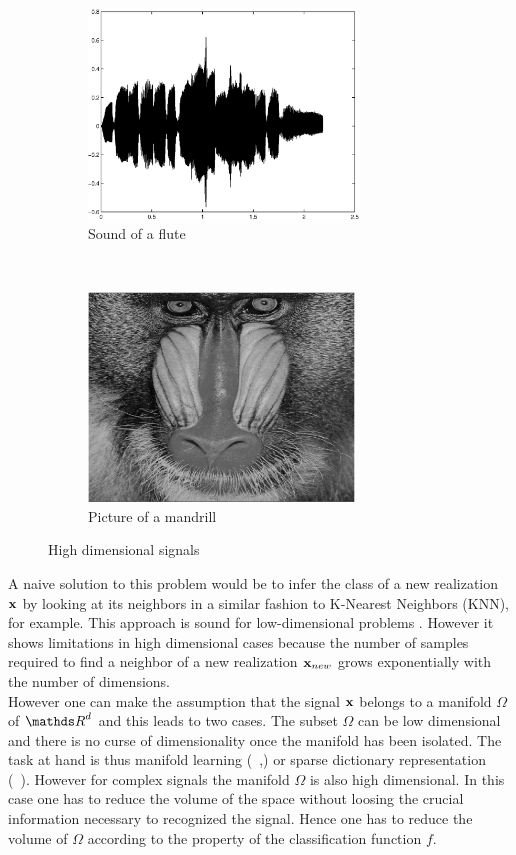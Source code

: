 \documentclass[a4paper,11pt]{report}
\begin{document}
		\begin{figure}[t!]
			\centering
			\begin{subfigure}[t]{0.5\textwidth}
				\centering
				\includegraphics[height=2.2in]{waveform_flute.eps}
				\caption{Sound of a flute}
			\end{subfigure}%
			~ 
			\begin{subfigure}[t]{0.5\textwidth}
        \centering
        \includegraphics[height=2.2in]{im_mandrill.eps}
        \caption{Picture of a mandrill}
			\end{subfigure}
			\caption{High dimensional signals}
			\label{fig:highDim signals}
		\end{figure}
		
		A naive solution to this problem would be to infer the class of a new realization ${\bf x}$ by looking at its neighbors in a similar fashion to K-Nearest Neighbors (KNN), for example. This approach is sound for low-dimensional problems \cite{cover1967nearest}. However it shows limitations in high dimensional cases \cite{beyer1999nearest} because the number of samples required to find a neighbor of a new realization ${\bf x}_{new}$ grows exponentially with the number of dimensions.\\
			
		However one can make the assumption that the signal ${\bf x}$ belongs to a manifold $\Omega$ of $\dsR^{d}$ and this leads to two cases. The subset $\Omega$ can be low dimensional and there is no curse of dimensionality once the manifold has been isolated. The task at hand is thus manifold learning (~\cite{lin2008riemannian},\cite{zhang2012adaptive}) or sparse dictionary representation (~\cite{kreutz2003dictionary}). However for complex signals the manifold $\Omega$ is also high dimensional. In this case one has to reduce the volume of the space without loosing the crucial information necessary to recognized the signal. Hence one has to reduce the volume of $\Omega$ according to the property of the classification function $f$.
		
\end{document}
